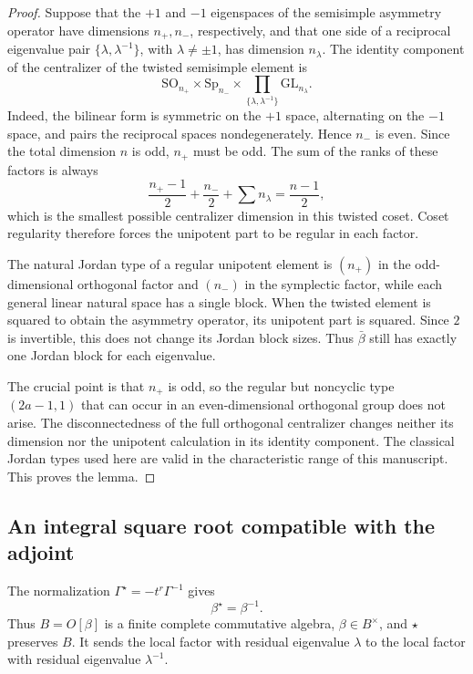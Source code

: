 \documentclass[11pt,a4paper]{article}
\theoremstyle{definition}
\theoremstyle{remark}
\begin{document}
\begin{proof}
Suppose that the \(+1\) and \(-1\) eigenspaces of the semisimple asymmetry
operator have dimensions \(n_+,n_-\), respectively, and that one side of
a reciprocal eigenvalue pair
\(\{\lambda,\lambda^{-1}\}\), with \(\lambda\ne\pm1\), has dimension
\(n_\lambda\). The identity component of the centralizer of the twisted
semisimple element is
\[
\mathrm{SO}_{n_+}\times\mathrm{Sp}_{n_-}
\times\prod_{\{\lambda,\lambda^{-1}\}}\mathrm{GL}_{n_\lambda}.
\]
Indeed, the bilinear form is symmetric on the \(+1\) space, alternating
on the \(-1\) space, and pairs the reciprocal spaces nondegenerately.
Hence \(n_-\) is even. Since the total dimension \(n\) is odd, \(n_+\)
must be odd. The sum of the ranks of these factors is always
\[
\frac{n_+-1}2+\frac{n_-}2+\sum n_\lambda
=\frac{n-1}2,
\]
which is the smallest possible centralizer dimension in this twisted
coset. Coset regularity therefore forces the unipotent part to be
regular in each factor.

The natural Jordan type of a regular unipotent element is \((n_+)\) in
the odd-dimensional orthogonal factor and \((n_-)\) in the symplectic
factor, while each general linear natural space has a single block.
When the twisted element is squared to obtain the asymmetry operator,
its unipotent part is squared. Since \(2\) is invertible, this does not
change its Jordan block sizes. Thus \(\bar\beta\) still has exactly one
Jordan block for each eigenvalue.

The crucial point is that \(n_+\) is odd, so the regular but noncyclic
type \((2a-1,1)\) that can occur in an even-dimensional orthogonal group
does not arise. The disconnectedness of the full orthogonal centralizer
changes neither its dimension nor the unipotent calculation in its
identity component. The classical Jordan types used here are valid in
the characteristic range of this manuscript. This proves the lemma.
\end{proof}

\subsection{An integral square root compatible with the adjoint}

The normalization \(\Gamma^\star=-t^r\Gamma^{-1}\) gives
\[
\beta^\star=\beta^{-1}.
\]
Thus \(B=O[\beta]\) is a finite complete commutative algebra,
\(\beta\in B^\times\), and \(\star\) preserves \(B\). It sends the local
factor with residual eigenvalue \(\lambda\) to the local factor with
residual eigenvalue \(\lambda^{-1}\).
\end{document}
